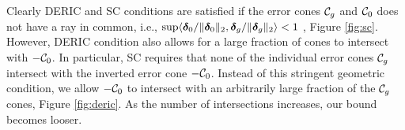 \begin{remark}
Clearly DERIC and SC conditions are satisfied if the error cones ${\cal C}_g$ and ${\cal C}_0$ does not have a ray in common, i.e., $\sup \langle \boldsymbol{\delta}_0/\|\boldsymbol{\delta}_0\|_{2}, \boldsymbol{\delta}_g/\|\boldsymbol{\delta}_g\|_{2} \rangle < 1$ \cite{trop15, guba16}, Figure \ref{fig:sc}. 
However, DERIC condition also allows for a large fraction of cones to intersect with $-{\cal C}_0$.
In particular, SC requires that none of the individual error cones ${\cal C}_g$ intersect with the inverted error cone $-{\cal C}_0$.
Instead of this stringent geometric condition, we allow $-{\cal C}_0$ to intersect with an arbitrarily large fraction of the ${\cal C}_g$ cones, Figure \ref{fig:deric}.
As the number of intersections increases, our bound becomes looser.
\end{remark}

%


